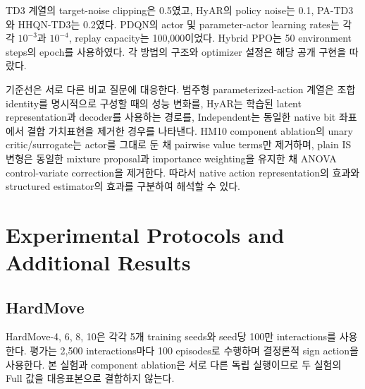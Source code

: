 \documentclass[10pt,journal]{IEEEtran}
\begin{document}
TD3 계열의 target-noise clipping은 0.5였고, HyAR의 policy noise는 0.1, PA-TD3와 HHQN-TD3는 0.2였다. PDQN의 actor 및 parameter-actor learning rates는 각각 $10^{-3}$과 $10^{-4}$, replay capacity는 100,000이었다. Hybrid PPO는 50 environment steps의 epoch를 사용하였다. 각 방법의 구조와 optimizer 설정은 해당 공개 구현을 따랐다.

기준선은 서로 다른 비교 질문에 대응한다. 범주형 parameterized-action 계열은 조합 identity를 명시적으로 구성할 때의 성능 변화를, HyAR는 학습된 latent representation과 decoder를 사용하는 경로를, Independent는 동일한 native bit 좌표에서 결합 가치표현을 제거한 경우를 나타낸다. HM10 component ablation의 unary critic/surrogate는 actor를 그대로 둔 채 pairwise value terms만 제거하며, plain IS 변형은 동일한 mixture proposal과 importance weighting을 유지한 채 ANOVA control-variate correction을 제거한다. 따라서 native action representation의 효과와 structured estimator의 효과를 구분하여 해석할 수 있다.

\section{Experimental Protocols and Additional Results}
\label{sec:protocols}

\subsection{HardMove}

HardMove-4, 6, 8, 10은 각각 5개 training seeds와 seed당 100만 interactions를 사용한다. 평가는 2,500 interactions마다 100 episodes로 수행하며 결정론적 sign action을 사용한다. 본 실험과 component ablation은 서로 다른 독립 실행이므로 두 실험의 Full 값을 대응표본으로 결합하지 않는다.

\begin{table}[!t]
\centering
\caption{Complete HardMove final-success comparison. Values are mean $\pm$ sample standard deviation over five training seeds.}
\label{tab:supp-hardmove}
\end{table}
\end{document}
